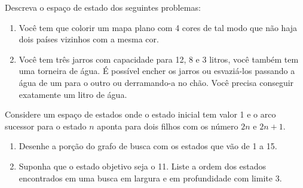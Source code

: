 \documentclass[12pt]{exam}
\begin{document}
\begin{questions}
\item Descreva o espaço de estado dos seguintes problemas:
\begin{enumerate}

\item Você tem que colorir um mapa plano com 4 cores de tal modo que não haja dois países vizinhos com a mesma cor.


\item Você tem três jarros com capacidade para 12, 8 e 3 litros, você também tem uma torneira de água. É possível encher os jarros ou esvaziá-los passando a água de um para o outro ou derramando-a no chão. Você precisa conseguir exatamente um litro de água.

\end{enumerate}

\item Considere um espaço de estados onde o estado inicial tem valor 1 e o arco sucessor para o estado $n$ aponta para dois filhos com os número $2n$ e $2n+1$.
\begin{enumerate}

\item Desenhe a porção do grafo de busca com os estados que vão de 1 a 15.

\item Suponha que o estado objetivo seja o 11. Liste a ordem dos estados encontrados em uma busca em largura e em profundidade com limite 3.


\end{enumerate}

\end{questions}
\end{document}
